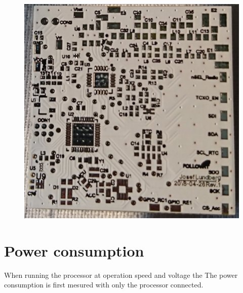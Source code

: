 \begin{figure}[H]
	\centering
    \includegraphics[width=.8\linewidth]{Figures/PWB}
	\label{fig:pcbr1}
\end{figure}


\section{Power consumption}
When running the processor at operation speed and voltage the 
The power consumption is first mesured with only the processor connected. 